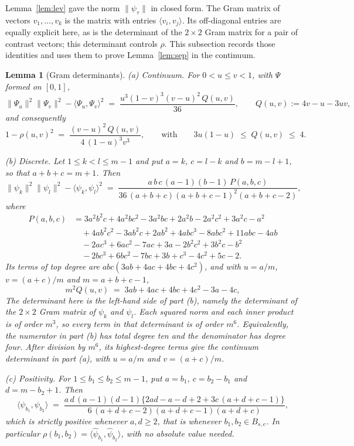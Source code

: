 \documentclass[12pt, a4paper]{article}
\newtheorem{lemma}{Lemma}[section]
\begin{document}
Lemma~\ref{lem:lev} gave the norm $\|\psi_\tau\|$ in closed form. The Gram
matrix of vectors $v_1,\ldots,v_k$ is the matrix with entries
$\langle v_i,v_j\rangle$. Its off-diagonal entries are equally explicit here,
as is the determinant of the $2\times2$ Gram matrix for a pair of contrast
vectors; this determinant controls $\rho$. This subsection records those
identities and uses them to prove Lemma~\ref{lem:sep} in the continuum.

\begin{lemma}[Gram determinants]
\label{lem:gramdet}
\emph{(a) Continuum.} For $0 < u \le v < 1$, with $\Psi$ formed on $[0,1]$,
\[
\|\Psi_u\|^2\|\Psi_v\|^2 - \langle \Psi_u,\Psi_v\rangle^2
\;=\; \frac{u^3 (1-v)^3 (v-u)^2 \, Q(u,v)}{36},
\qquad Q(u,v) := 4v - u - 3uv ,
\]
and consequently
\begin{equation}
\label{eq:rhoexact}
1 - \rho(u,v)^2 \;=\; \frac{(v-u)^2\,Q(u,v)}{4\,(1-u)^3 v^3},
\qquad\text{with}\qquad
3u(1-u) \;\le\; Q(u,v) \;\le\; 4 .
\end{equation}

\emph{(b) Discrete.} Let $1 \le k < l \le m-1$ and put $a = k$, $c = l-k$ and
$b = m-l+1$, so that $a+b+c = m+1$. Then
\[
\|\psi_k\|^2\|\psi_l\|^2 - \langle\psi_k,\psi_l\rangle^2
\;=\; \frac{a\,b\,c\,(a-1)(b-1)\,P(a,b,c)}
{36\,(a+b+c)(a+b+c-1)^2(a+b+c-2)} ,
\]
where
\begin{align*}
P(a,b,c) &= 3a^2b^2c + 4a^2bc^2 - 3a^2bc + 2a^2b - 2a^2c^2 + 3a^2c - a^2 \\
&\quad + 4ab^2c^2 - 3ab^2c + 2ab^2 + 4abc^3 - 8abc^2 + 11abc - 4ab \\
&\quad - 2ac^3 + 6ac^2 - 7ac + 3a - 2b^2c^2 + 3b^2c - b^2 \\
&\quad - 2bc^3 + 6bc^2 - 7bc + 3b + c^3 - 4c^2 + 5c - 2 .
\end{align*}
Its terms of top degree are $abc(3ab+4ac+4bc+4c^2)$, and with $u = a/m$, $v = (a+c)/m$ and $m = a+b+c-1$,
\[
m^2 Q(u,v) \;=\; 3ab + 4ac + 4bc + 4c^2 - 3a - 4c ,
\]
The determinant here is the left-hand side of part (b), namely the determinant
of the $2\times2$ Gram matrix of $\psi_k$ and $\psi_l$. Each squared norm and
each inner product is of order $m^3$, so every term in that determinant is of
order $m^6$. Equivalently, the numerator in part (b) has total degree ten and
the denominator has degree four. After division by $m^6$, its highest-degree
terms give the continuum determinant in part (a), with
$u=a/m$ and $v=(a+c)/m$.

\emph{(c) Positivity.} For $1 \le b_1 \le b_2 \le m-1$, put $a = b_1$, $c = b_2-b_1$ and $d = m-b_2+1$. Then
\[
\langle \psi_{b_1}, \psi_{b_2}\rangle \;=\;
\frac{a\,d\,(a-1)(d-1)\big\{ 2ad-a-d+2 + 3c\,(a+d+c-1) \big\}}
{6\,(a+d+c-2)(a+d+c-1)(a+d+c)} ,
\]
which is strictly positive whenever $a, d \ge 2$, that is whenever $b_1, b_2 \in B_{s,e}$. In particular $\rho(b_1,b_2) = \langle\hat\psi_{b_1},\hat\psi_{b_2}\rangle$, with no absolute value needed.
\end{lemma}
\end{document}
